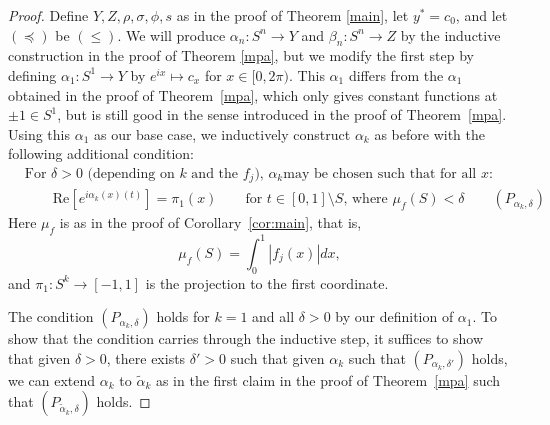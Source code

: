 \documentclass[11pt, reqno, english]{amsart}
\theoremstyle{plain}
\theoremstyle{definition}
\begin{document}
\begin{proof}
  Define $Y, Z, \rho, \sigma, \phi, s$ as in the proof of Theorem \ref{main},
  let $y^{*} = c_{0}$, and let $(\preceq)$ be $(\le)$. We will produce
  $\alpha_{n}\colon S^{n} \rightarrow Y$ and $\beta_{n}\colon S^{n} \rightarrow
  Z$ by the inductive construction in the proof of Theorem \ref{mpa}, but we
  modify the first step by defining $\alpha_{1}\colon S^{1} \rightarrow Y$ by
  $e^{ix} \mapsto c_{x}$ for $x \in [0, 2\pi)$. This $\alpha_{1}$ differs from
  the $\alpha_{1}$ obtained in the proof of Theorem~\ref{mpa}, which only gives
  constant functions at $\pm 1 \in S^{1}$, but is still good in the sense introduced 
  in the proof of Theorem~\ref{mpa}. Using this $\alpha_{1}$ as our base case, we 
  inductively construct $\alpha_k$ as before with the following additional condition:
  \begin{align*}
    &\text{For $\delta > 0$ (depending on $k$ and the $f_{j}$), $\alpha_{k}$
    may be chosen such that for all $x$:}\\
    &\qquad\text{Re}[e^{i\alpha_{k}(x)(t)}] = \pi_{1}(x)\qquad\text{for $t \in
    [0, 1] \setminus S$, where $\mu_{f}(S) < \delta$}\qquad (P_{\alpha_{k},
    \delta})
  \end{align*}
  Here $\mu_{f}$ is as in the proof of Corollary~\ref{cor:main}, that is,
  $$\mu_{f}(S) = \int_{0}^{1}|f_{j}(x)|dx,$$ 
  and $\pi_{1}\colon
  S^{k}\rightarrow [-1, 1]$ is the projection to the first coordinate.

  The condition $(P_{\alpha_{k}, \delta})$ holds for $k = 1$ and
  all $\delta > 0$ by our definition of $\alpha_{1}$. To show that the
  condition carries through the inductive step, it suffices to show that given
  $\delta > 0$, there exists $\delta' > 0$ such that given $\alpha_{k}$ such
  that $(P_{\alpha_{k}, \delta'})$ holds, we can extend $\alpha_{k}$ to
  $\widetilde{\alpha}_{k}$ as in the first claim in the proof of Theorem~\ref{mpa} such that
  $(P_{\widetilde{\alpha}_{k}, \delta})$ holds.


\end{proof}
\end{document}
